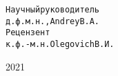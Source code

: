 \begin{titlepage}
    \begin{alltt}                                                         
                       Научный руководитель                                             
                       д.ф.м.н., Andrey В.А.                                            
                       Рецензент                                                        
                       к.ф.-м.н. Olegovich В.И.                                         
    \end{alltt}                                                           
                                                                                        
                                                                                        
    \vspace{\fill}                                                    
                                                                                        
    \begin{center}                                                        
     2021                                                                
    \end{center}                                                          
                                                                                        
    \end{titlepage}